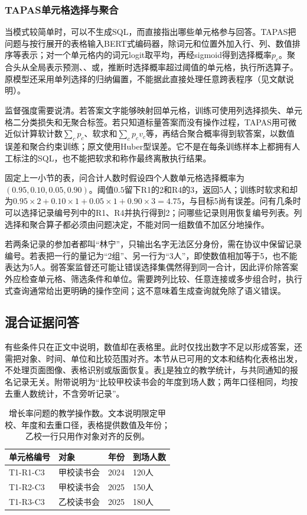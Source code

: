 \subsubsection{TAPAS单元格选择与聚合}
\label{sec:nlp-dialogue-tapas}

当模式较简单时，可以不生成SQL，而直接指出哪些单元格参与回答。TAPAS把问题与按行展开的表格输入BERT式编码器，除词元和位置外加入行、列、数值排序等表示；对一个单元格内的词元logit取平均，再经sigmoid得到选择概率$p_c$。聚合头从全局表示预测、、或，推断时选择概率超过阈值的单元格，执行所选算子。原模型还采用单列选择的归纳偏置，不能据此直接处理任意跨表程序（见文献说明）。

监督强度需要说清。若答案文字能够映射回单元格，训练可使用列选择损失、单元格二分类损失和无聚合标签。若只知道标量答案而没有操作过程，TAPAS用可微近似计算软计数$\sum_c p_c$、软求和$\sum_c p_cv_c$等，再结合聚合概率得到软答案，以数值误差和聚合约束训练；原文使用Huber型误差。它不是在每条训练样本上都拥有人工标注的SQL，也不能把软求和称作最终离散执行结果。

固定上一小节的表，问合计人数时假设四个人数单元格选择概率为$(0.95,0.10,0.05,0.90)$。阈值$0.5$留下R1的2和R4的3，返回5人；训练时软求和却为$0.95\times2+0.10\times1+0.05\times1+0.90\times3=4.75$，与目标5尚有误差。问有几条时可以选择记录编号列中的R1、R4并执行得到2；问哪些记录则用恢复编号列表。列选择和聚合算子都必须由问题决定，不能对同一组数值不加区分地操作。

若两条记录的参加者都叫“林宁”，只输出名字无法区分身份，需在协议中保留记录编号。若表把一行的量记为“2组”、另一行为“3人”，即使数值相加等于5，也不能表达为5人。弱答案监督还可能让错误选择集偶然得到同一合计，因此评价除答案外应检查单元格、筛选条件和单位。需要跨列比较、任意连接或多步组合时，执行式查询通常给出更明确的操作空间；这不意味着生成查询就免除了语义错误。

\subsection{混合证据问答}
\label{sec:nlp-dialogue-hybrid-qa}

有些条件只在正文中说明，数值却在表格里。此时仅找出数字不足以形成答案，还需把对象、时间、单位和比较范围对齐。本节从已可用的文本和结构化表格出发，不处理页面图像、表格识别或版面恢复。表\ref{tab:nlp-dialogue-operands}是独立的教学统计，与共同通知的报名记录无关。附带说明为“比较甲校读书会的年度到场人数；两年口径相同，均按去重人数统计，不含旁听记录”。

\begin{table}[htbp]
  \centering
  \begin{tabular}{llll}
    \toprule
    单元格编号 & 对象 & 年份 & 到场人数\\
    \midrule
    T1-R1-C3 & 甲校读书会 & 2024 & 120人\\
    T1-R2-C3 & 甲校读书会 & 2025 & 150人\\
    T1-R3-C3 & 乙校读书会 & 2025 & 180人\\
    \bottomrule
  \end{tabular}
  \caption{增长率问题的教学操作数。文本说明限定甲校、年度和去重口径，表格提供数值及年份；乙校一行只用作对象对齐的反例。}
  \label{tab:nlp-dialogue-operands}
\end{table}

